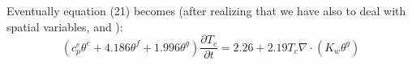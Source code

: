 Eventually equation (21) becomes (after realizing that we have also to deal with spatial variables, and ):
\begin{equation}
(c_p^e \theta^e + 4.186 \theta^f + 1.996 \theta^g) \frac{\partial T_c}{\partial t} = 2.26 + 2.19 T_c \nabla \cdot ( K_w  \theta^g)
\end{equation}